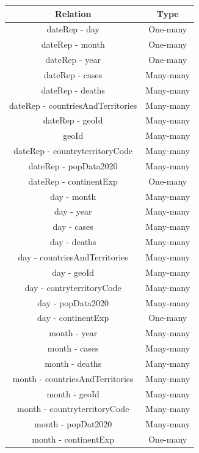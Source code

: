 \documentclass[12pt,oneside,a4paper,english]{article}
\begin{document}
 \begin{tabular}[t]{c c} %
  \hline\hline %
  \textbf{Relation} & \textbf{Type} \\ [0.5ex]
  \hline %
  dateRep - day & One-many\\ [0.5ex] 
  dateRep - month & One-many\\ [0.5ex]
  dateRep - year & One-many\\ [0.5ex]
  dateRep - cases & Many-many\\ [0.5ex]
  dateRep - deaths & Many-many\\ [0.5ex]
  dateRep - countriesAndTerritories & Many-many\\ [0.5ex]
  dateRep - geoId & Many-many\\ [0.5ex]
  geoId & Many-many\\ [0.5ex]
  dateRep - countryterritoryCode & Many-many\\ [0.5ex]
  dateRep - popData2020 & Many-many\\ [0.5ex]
  dateRep - continentExp & One-many\\ [0.5ex]
  day - month & Many-many\\ [0.5ex]
  day - year & Many-many\\ [0.5ex]
  day - cases & Many-many\\ [0.5ex]
  day - deaths & Many-many\\ [0.5ex]
  day - countriesAndTerritories & Many-many\\ [0.5ex]
  day - geoId & Many-many\\ [0.5ex]
  day - contryterritoryCode & Many-many\\ [0.5ex]
  day - popData2020 & Many-many\\ [0.5ex]
  day - continentExp & One-many\\ [0.5ex]
  month - year & Many-many\\ [0.5ex]
  month - cases & Many-many\\ [0.5ex]
  month - deaths & Many-many\\ [0.5ex]
  month - countriesAndTerritories & Many-many\\ [0.5ex]
  month - geoId & Many-many\\ [0.5ex]
  month - countryterritoryCode & Many-many\\ [0.5ex]
  month - popDat2020 & Many-many\\ [0.5ex]
  month - continentExp & One-many\\ [0.5ex]
  \hline
  \end{tabular}
\end{document}

